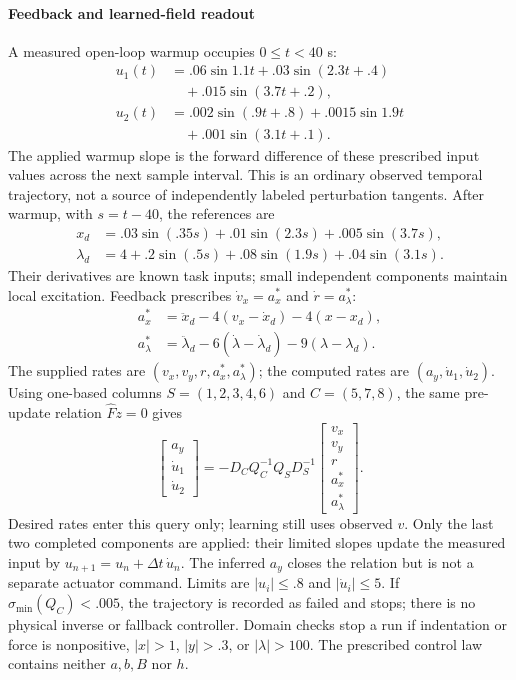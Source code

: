 \paragraph{Feedback and learned-field readout}
A measured open-loop warmup occupies $0\le t<40$ s:
\begin{align}
 u_1(t)&=.06\sin1.1t+.03\sin(2.3t+.4)\nonumber\\
       &\quad+.015\sin(3.7t+.2),\nonumber\\
 u_2(t)&=.002\sin(.9t+.8)+.0015\sin1.9t\nonumber\\
       &\quad+.001\sin(3.1t+.1).
 \label{eq:direct_contact_probe}
\end{align}
The applied warmup slope is the forward difference of these prescribed input
values across the next sample interval. This is an ordinary observed temporal
trajectory, not a source of independently labeled perturbation tangents.
After warmup, with $s=t-40$, the references are
\begin{align}
 x_d&=.03\sin(.35s)+.01\sin(2.3s)+.005\sin(3.7s),\nonumber\\
 \lambda_d&=4+.2\sin(.5s)+.08\sin(1.9s)+.04\sin(3.1s).
 \label{eq:direct_contact_reference}
\end{align}
Their derivatives are known task inputs; small independent components maintain
local excitation. Feedback prescribes $\dot v_x=a_x^*$ and
$\dot r=a_\lambda^*$:
\begin{align}
 a_x^*&=\ddot x_d-4(v_x-\dot x_d)-4(x-x_d),\nonumber\\
 a_\lambda^*&=\ddot\lambda_d-6(\dot\lambda-\dot\lambda_d)
                         -9(\lambda-\lambda_d).
 \label{eq:direct_contact_feedback}
\end{align}
The supplied rates are $(v_x,v_y,r,a_x^*,a_\lambda^*)$; the computed
rates are $(a_y,\dot u_1,\dot u_2)$. Using one-based columns
$S=(1,2,3,4,6)$ and $C=(5,7,8)$, the same pre-update relation
$\widehat F\dot z=0$ gives
\begin{equation}
 \begin{bmatrix}a_y\\\dot u_1\\\dot u_2\end{bmatrix}
 =-D_CQ_C^{-1}Q_SD_S^{-1}
 \begin{bmatrix}v_x\\v_y\\r\\a_x^*\\a_\lambda^*\end{bmatrix}.
 \label{eq:direct_contact_completion}
\end{equation}
Desired rates enter this query only; learning still uses observed $v$.
Only the last two completed components are applied: their limited slopes
update the measured input by $u_{n+1}=u_n+\Delta t\,\dot u_n$.
The inferred $a_y$ closes the relation but is not a separate actuator command.
Limits are $|u_i|\le.8$ and $|\dot u_i|\le5$.
If $\sigma_{\min}(Q_C)<.005$, the trajectory is recorded as failed and stops;
there is no physical inverse or fallback controller. Domain checks stop a run
if indentation or force is nonpositive, $|x|>1$, $|y|>.3$, or $|\lambda|>100$.
The prescribed control law contains neither $a,b,B$ nor $h$.

